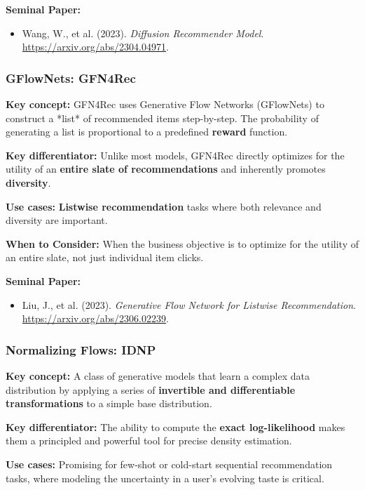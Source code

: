 \documentclass{article}
\begin{document}
\noindent\textbf{Seminal Paper:}
    \begin{itemize}
        \item Wang, W., et al. (2023). \textit{Diffusion Recommender Model}. \url{https://arxiv.org/abs/2304.04971}.
    \end{itemize}

    \subsubsection{GFlowNets: GFN4Rec}
\noindent\textbf{Key concept:} GFN4Rec uses Generative Flow Networks (GFlowNets) to construct a *list* of recommended items step-by-step. The probability of generating a list is proportional to a predefined \textbf{reward} function.

\noindent\textbf{Key differentiator:} Unlike most models, GFN4Rec directly optimizes for the utility of an \textbf{entire slate of recommendations} and inherently promotes \textbf{diversity}.

\noindent\textbf{Use cases:} \textbf{Listwise recommendation} tasks where both relevance and diversity are important.

\noindent\textbf{When to Consider:} When the business objective is to optimize for the utility of an entire slate, not just individual item clicks.

\noindent\textbf{Seminal Paper:}
    \begin{itemize}
        \item Liu, J., et al. (2023). \textit{Generative Flow Network for Listwise Recommendation}. \url{https://arxiv.org/abs/2306.02239}.
    \end{itemize}

    \subsubsection{Normalizing Flows: IDNP}
\noindent\textbf{Key concept:} A class of generative models that learn a complex data distribution by applying a series of \textbf{invertible and differentiable transformations} to a simple base distribution.

\noindent\textbf{Key differentiator:} The ability to compute the \textbf{exact log-likelihood} makes them a principled and powerful tool for precise density estimation.

\noindent\textbf{Use cases:} Promising for few-shot or cold-start sequential recommendation tasks, where modeling the uncertainty in a user's evolving taste is critical.
\end{document}
